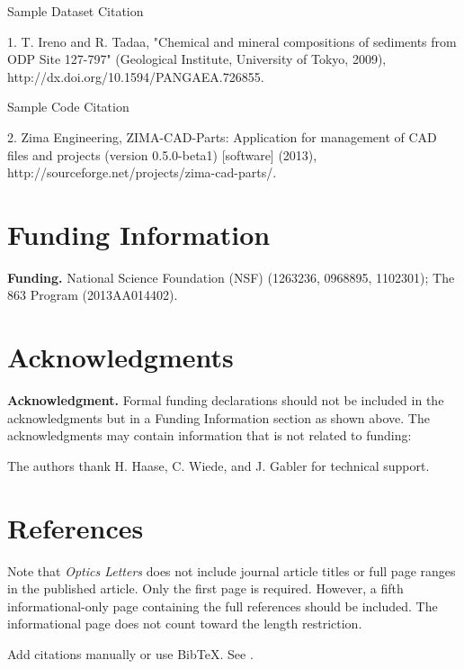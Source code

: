\documentclass[9pt,twocolumn,twoside]{osajnl}
\begin{document}
Sample Dataset Citation

1. T. Ireno and R. Tadaa, "Chemical and mineral compositions of sediments from ODP Site 127-797" (Geological Institute, University of Tokyo, 2009), http://dx.doi.org/10.1594/PANGAEA.726855.

Sample Code Citation

2. Zima Engineering, ZIMA-CAD-Parts: Application for management of CAD files and projects (version 0.5.0-beta1) [software] (2013), http://sourceforge.net/projects/zima-cad-parts/.

\section*{Funding Information}

\textbf{Funding.} National Science Foundation (NSF) (1263236, 0968895, 1102301); The 863 Program (2013AA014402).

\section*{Acknowledgments}

\textbf{Acknowledgment.} Formal funding declarations should not be included in the acknowledgments but in a Funding Information section as shown above. The acknowledgments may contain information that is not related to funding:

The authors thank H. Haase, C. Wiede, and J. Gabler for technical support.

\section*{References}

Note that \emph{Optics Letters} does not include journal article titles or full page ranges in the published article. Only the first page is required. However, a fifth informational-only page containing the full references should be included. The informational page does not count toward the length restriction.

\bigskip
\noindent Add citations manually or use BibTeX. See \cite{Zhang:14}.



\end{document}
